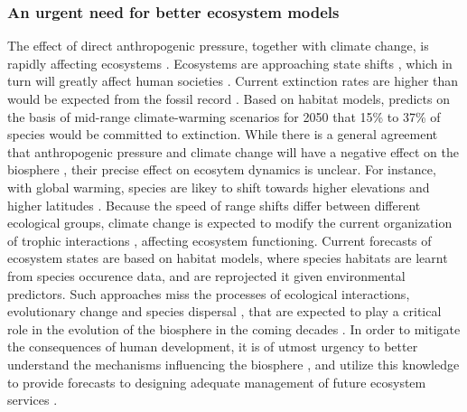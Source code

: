 \subsubsection*{An urgent need for better ecosystem models}
The effect of direct anthropogenic pressure, together with climate change, is rapidly affecting ecosystems \cite{Ellis2011,Midgley2019}. Ecosystems are approaching state shifts \cite{Barnosky2012}, which in turn will greatly affect human societies \cite{Mooney2009}.
%
Current extinction rates are higher than would be expected from the fossil record \cite{Barnosky2011}. Based on habitat models, \cite{Midgley2019} predicts on the basis of mid-range climate-warming scenarios for 2050 that 15\% to 37\% of species would be committed to extinction. 
% 
While there is a general agreement that anthropogenic pressure and climate change will have a negative effect on the biosphere \cite{fischlin2007ecosystems}, their precise effect on ecosytem dynamics is unclear. For instance, with global warming, species are likey to shift towards higher elevations and higher latitudes \cite{Chen2011}. Because the speed of range shifts differ between different ecological groups, climate change is expected to modify the current organization of trophic interactions \cite{Descombes2020}, affecting ecosystem functioning.
%
Current forecasts of ecosystem states are based on habitat models, where species habitats are learnt from species occurence data, and are reprojected it given environmental predictors.
% 
Such approaches miss the processes of ecological interactions, evolutionary change and species dispersal \cite{Pearson2003}, that are expected to play a critical role in the evolution of the biosphere in the coming decades \cite{Norberg2012}.
% 
In order to mitigate the consequences of human development, it is of utmost urgency to better understand the mechanisms influencing the biosphere \cite{Rahbek2019}, and utilize this knowledge to provide forecasts to designing adequate management of future ecosystem services \cite{Clark2001,Norberg2012}.


